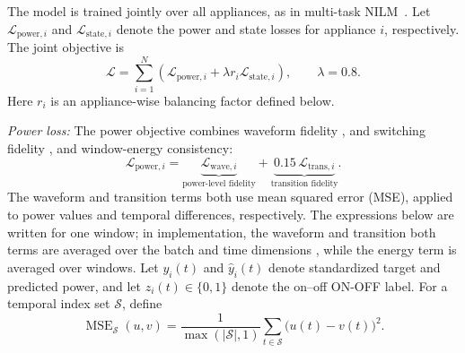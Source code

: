 \documentclass[journal]{IEEEtran}
\providecommand{\DIFadd}[1]{{\protect\color{blue} \sf #1}} %
\providecommand{\DIFdel}[1]{{\protect\color{red} \scriptsize #1}} %
\providecommand{\DIFaddbegin}{} %
\providecommand{\DIFaddend}{} %
\providecommand{\DIFdelbegin}{} %
\providecommand{\DIFdelend}{} %
\providecommand{\DIFscaledelfig}{0.5}
\newlength{\DIFdelgraphicswidth} %
\newlength{\DIFdelgraphicsheight} %
\providecommand{\DIFaddincludegraphics}[2][]{{\color{blue}\fbox{\DIFOincludegraphics[#1]{#2}}}} %
\providecommand{\DIFdelincludegraphics}[2][]{%
\sbox{\DIFdelgraphicsbox}{\DIFOincludegraphics[#1]{#2}}%
\settoboxwidth{\DIFdelgraphicswidth}{\DIFdelgraphicsbox} %
\settoboxtotalheight{\DIFdelgraphicsheight}{\DIFdelgraphicsbox} %
\scalebox{\DIFscaledelfig}{%
\parbox[b]{\DIFdelgraphicswidth}{\usebox{\DIFdelgraphicsbox}\\[-\baselineskip] \rule{\DIFdelgraphicswidth}{0em}}\llap{\resizebox{\DIFdelgraphicswidth}{\DIFdelgraphicsheight}{%
\setlength{\unitlength}{\DIFdelgraphicswidth}%
\begin{picture}(1,1)%
\thicklines\linethickness{2pt} %
{\color[rgb]{1,0,0}\put(0,0){\framebox(1,1){}}}%
{\color[rgb]{1,0,0}\put(0,0){\line( 1,1){1}}}%
{\color[rgb]{1,0,0}\put(0,1){\line(1,-1){1}}}%
\end{picture}%
}\hspace*{3pt}}} %
} %
\DeclareRobustCommand{\DIFaddbegin}{\DIFOaddbegin \let\includegraphics\DIFaddincludegraphics} %
\DeclareRobustCommand{\DIFaddend}{\DIFOaddend \let\includegraphics\DIFOincludegraphics} %
\DeclareRobustCommand{\DIFdelbegin}{\DIFOdelbegin \let\includegraphics\DIFdelincludegraphics} %
\DeclareRobustCommand{\DIFdelend}{\DIFOaddend \let\includegraphics\DIFOincludegraphics} %
\begin{document}
The model is trained jointly over all appliances, as in multi-task NILM~\cite{faustine2020unet,xiong2024matnilm,sun2025transfer}. Let $\mathcal{L}_{\mathrm{power},i}$ and $\mathcal{L}_{\mathrm{state},i}$ denote the power and state losses for appliance $i$, respectively. The joint objective is
\begin{equation}
\mathcal{L}=\sum_{i=1}^{N}\left(
\mathcal{L}_{\mathrm{power},i}
+\lambda r_i\mathcal{L}_{\mathrm{state},i}
\right),
\qquad \lambda=0.8.
\label{eq:loss}
\end{equation}
Here $r_i$ is an appliance-wise balancing factor defined below.

\textit{Power loss:}
The power objective combines waveform fidelity \DIFdelbegin \DIFdel{, }\DIFdelend \DIFaddbegin \DIFadd{and }\DIFaddend switching fidelity\DIFdelbegin \DIFdel{, and window-energy consistency}\DIFdelend :
\DIFdelbegin %
\DIFdelend \DIFaddbegin \begin{equation}
\mathcal{L}_{\mathrm{power},i}=
\underbrace{\mathcal{L}_{\mathrm{wave},i}}_{\text{power-level fidelity}}
+\underbrace{0.15\,\mathcal{L}_{\mathrm{trans},i}}_{\text{transition fidelity}}.
\label{eq:power-loss}
\end{equation}\DIFaddend 
The waveform and transition terms both use mean squared error (MSE), applied to power values and temporal differences, respectively. The expressions below are written for one window; in implementation, \DIFdelbegin \DIFdel{the waveform and transition }\DIFdelend \DIFaddbegin \DIFadd{both }\DIFaddend terms are averaged over the batch and time dimensions\DIFdelbegin \DIFdel{, while the energy term is averaged over windows}\DIFdelend . Let $y_i(t)$ and $\hat y_i(t)$ denote standardized target and predicted power, and let $z_i(t)\in\{0,1\}$ denote the \DIFdelbegin \DIFdel{on--off }\DIFdelend \DIFaddbegin \DIFadd{ON-OFF }\DIFaddend label. For a temporal index set $\mathcal{S}$, define
\begin{equation}
\operatorname{MSE}_{\mathcal{S}}(u,v)=
\frac{1}{\max(|\mathcal{S}|,1)}
\sum_{t\in\mathcal{S}}\bigl(u(t)-v(t)\bigr)^2.
\label{eq:temporal-mse}
\end{equation}
\end{document}
